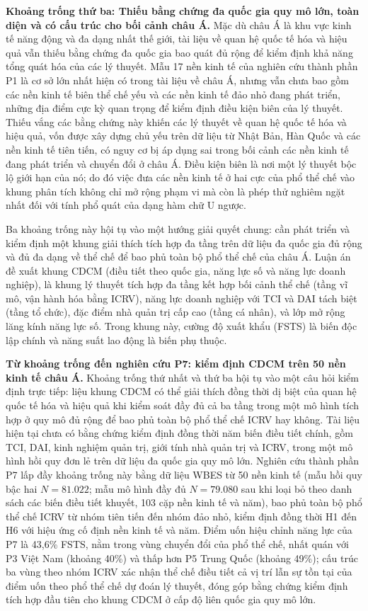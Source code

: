 \documentclass[
  a4paper,
  13pt]{extreport}
\begin{document}
\textbf{Khoảng trống thứ ba: Thiếu bằng chứng đa quốc gia quy mô lớn,
toàn diện và có cấu trúc cho bối cảnh châu Á.} Mặc dù châu Á là khu vực
kinh tế năng động và đa dạng nhất thế giới, tài liệu về quan hệ quốc tế
hóa và hiệu quả vẫn thiếu bằng chứng đa quốc gia bao quát đủ rộng để
kiểm định khả năng tổng quát hóa của các lý thuyết. Mẫu 17 nền kinh tế
của nghiên cứu thành phần P1 là cơ sở lớn nhất hiện có trong tài liệu về
châu Á, nhưng vẫn chưa bao gồm các nền kinh tế biên thể chế yếu và các
nền kinh tế đảo nhỏ đang phát triển, những địa điểm cực kỳ quan trọng để
kiểm định điều kiện biên của lý thuyết. Thiếu vắng các bằng chứng này
khiến các lý thuyết về quan hệ quốc tế hóa và hiệu quả, vốn được xây
dựng chủ yếu trên dữ liệu từ Nhật Bản, Hàn Quốc và các nền kinh tế tiên
tiến, có nguy cơ bị áp dụng sai trong bối cảnh các nền kinh tế đang phát
triển và chuyển đổi ở châu Á. Điều kiện biên là nơi một lý thuyết bộc lộ
giới hạn của nó; do đó việc đưa các nền kinh tế ở hai cực của phổ thể
chế vào khung phân tích không chỉ mở rộng phạm vi mà còn là phép thử
nghiêm ngặt nhất đối với tính phổ quát của dạng hàm chữ U ngược.

Ba khoảng trống này hội tụ vào một hướng giải quyết chung: cần phát
triển và kiểm định một khung giải thích tích hợp đa tầng trên dữ liệu đa
quốc gia đủ rộng và đủ đa dạng về thể chế để bao phủ toàn bộ phổ thể chế
của châu Á. Luận án đề xuất khung CDCM (điều tiết theo quốc gia, năng
lực số và năng lực doanh nghiệp), là khung lý thuyết tích hợp đa tầng
kết hợp bối cảnh thể chế (tầng vĩ mô, vận hành hóa bằng ICRV), năng lực
doanh nghiệp với TCI và DAI tách biệt (tầng tổ chức), đặc điểm nhà quản
trị cấp cao (tầng cá nhân), và lớp mở rộng lăng kính năng lực số. Trong
khung này, cường độ xuất khẩu (FSTS) là biến độc lập chính và năng suất
lao động là biến phụ thuộc.

\textbf{Từ khoảng trống đến nghiên cứu P7: kiểm định CDCM trên 50 nền
kinh tế châu Á.} Khoảng trống thứ nhất và thứ ba hội tụ vào một câu hỏi
kiểm định trực tiếp: liệu khung CDCM có thể giải thích đồng thời dị biệt
của quan hệ quốc tế hóa và hiệu quả khi kiểm soát đầy đủ cả ba tầng
trong một mô hình tích hợp ở quy mô đủ rộng để bao phủ toàn bộ phổ thể
chế ICRV hay không. Tài liệu hiện tại chưa có bằng chứng kiểm định đồng
thời năm biến điều tiết chính, gồm TCI, DAI, kinh nghiệm quản trị, giới
tính nhà quản trị và ICRV, trong một mô hình hồi quy đơn lẻ trên dữ liệu
đa quốc gia quy mô lớn. Nghiên cứu thành phần P7 lấp đầy khoảng trống
này bằng dữ liệu WBES từ 50 nền kinh tế (mẫu hồi quy bậc hai
\(N = 81.022\); mẫu mô hình đầy đủ \(N = 79.080\) sau khi loại bỏ theo
danh sách các biến điều tiết khuyết, 103 cặp nền kinh tế và năm), bao
phủ toàn bộ phổ thể chế ICRV từ nhóm tiên tiến đến nhóm đảo nhỏ, kiểm
định đồng thời H1 đến H6 với hiệu ứng cố định nền kinh tế và năm. Điểm
uốn hiệu chỉnh năng lực của P7 là 43,6\% FSTS, nằm trong vùng chuyển đổi
của phổ thể chế, nhất quán với P3 Việt Nam (khoảng 40\%) và thấp hơn P5
Trung Quốc (khoảng 49\%); cấu trúc ba vùng theo nhóm ICRV xác nhận thể
chế điều tiết cả vị trí lẫn sự tồn tại của điểm uốn theo phổ thể chế dự
đoán lý thuyết, đóng góp bằng chứng kiểm định tích hợp đầu tiên cho
khung CDCM ở cấp độ liên quốc gia quy mô lớn.
\end{document}
